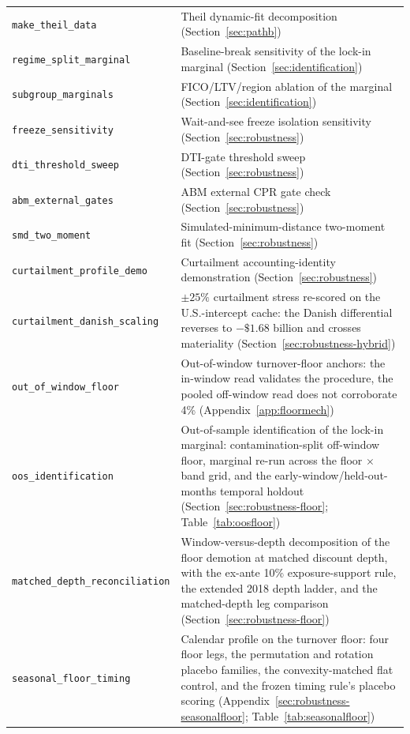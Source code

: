 \documentclass[12pt]{article}
\begin{document}
{\begin{longtable}{@{}p{5.4cm}p{8.8cm}@{}}
\texttt{make\_theil\_data} & Theil dynamic-fit decomposition (Section~\ref{sec:pathb}) \\
\texttt{regime\_split\_marginal} & Baseline-break sensitivity of the lock-in marginal (Section~\ref{sec:identification}) \\
\texttt{subgroup\_marginals} & FICO/LTV/region ablation of the marginal (Section~\ref{sec:identification}) \\
\texttt{freeze\_sensitivity} & Wait-and-see freeze isolation sensitivity (Section~\ref{sec:robustness}) \\
\texttt{dti\_threshold\_sweep} & DTI-gate threshold sweep (Section~\ref{sec:robustness}) \\
\texttt{abm\_external\_gates} & ABM external CPR gate check (Section~\ref{sec:robustness}) \\
\texttt{smd\_two\_moment} & Simulated-minimum-distance two-moment fit (Section~\ref{sec:robustness}) \\
\texttt{curtailment\_profile\_demo} & Curtailment accounting-identity demonstration (Section~\ref{sec:robustness}) \\
\texttt{curtailment\_danish\_scaling} & $\pm 25\%$ curtailment stress re-scored on the U.S.-intercept cache: the Danish differential reverses to $-\$1.68$ billion and crosses materiality (Section~\ref{sec:robustness-hybrid}) \\
\texttt{out\_of\_window\_floor} & Out-of-window turnover-floor anchors: the in-window read validates the procedure, the pooled off-window read does not corroborate 4\% (Appendix~\ref{app:floormech}) \\
\texttt{oos\_identification} & Out-of-sample identification of the lock-in marginal: contamination-split off-window floor, marginal re-run across the floor $\times$ band grid, and the early-window/held-out-months temporal holdout (Section~\ref{sec:robustness-floor}; Table~\ref{tab:oosfloor}) \\
\texttt{matched\_depth\_reconciliation} & Window-versus-depth decomposition of the floor demotion at matched discount depth, with the ex-ante 10\% exposure-support rule, the extended 2018 depth ladder, and the matched-depth leg comparison (Section~\ref{sec:robustness-floor}) \\
\texttt{seasonal\_floor\_timing} & Calendar profile on the turnover floor: four floor legs, the permutation and rotation placebo families, the convexity-matched flat control, and the frozen timing rule's placebo scoring (Appendix~\ref{sec:robustness-seasonalfloor}; Table~\ref{tab:seasonalfloor}) \\

\end{longtable}}
\end{document}
